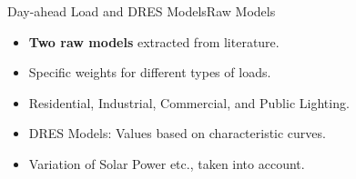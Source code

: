 \documentclass[xcolor=svgnames,aspectratio=32,8pt]{beamer}
\begin{document}
\begin{frame}
{Day-ahead Load and DRES Models}{Raw Models}

\begin{changemargin}{-1cm}{-1cm} 
  \vspace{0.5cm}
  \begin{minipage}[!h]{0.4\paperwidth}

  \begin{itemize}
  \item \textbf{Two raw models} extracted from literature.
  \item Specific weights for different types of loads.
  \item Residential, Industrial, Commercial, and Public Lighting.
  \item DRES Models: Values based on characteristic curves.
  \item Variation of Solar Power etc., taken into account.
  \end{itemize}

  \end{minipage}%
  \begin{minipage}[!h]{0.6\paperwidth}

  \begin{figure}[!h]
  \centering
  \newlength\figureheight
  \newlength\figurewidth
  \setlength\figureheight{2cm}
  \setlength\figurewidth{0.5\paperwidth}
  
  \end{figure}
  \begin{figure}[!h]
  \centering
  \setlength\figureheight{2cm}
  \setlength\figurewidth{0.5\paperwidth}
  
  \end{figure}

  \end{minipage}

\end{changemargin}
\end{frame}

\end{document}

